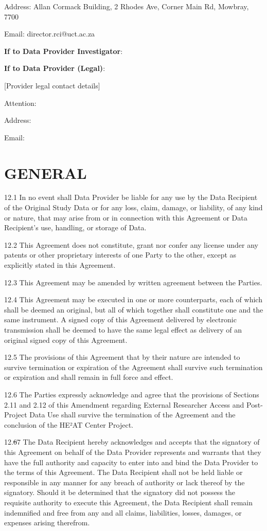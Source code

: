 \documentclass[12pt,letterpaper]{article}
\newcommand{\deleted}[1]{\textcolor{deletecolor}{\sout{#1}}}
\newcommand{\added}[1]{\textcolor{addcolor}{#1}}
\begin{document}
Address: Allan Cormack Building, 2 Rhodes Ave, Corner Main Rd, Mowbray, 7700

Email: director.rci@uct.ac.za

\textbf{If to Data Provider Investigator}:

\textbf{If to Data Provider (Legal)}:

[Provider legal contact details]

Attention:

Address:

Email:

\section{GENERAL}

12.1 In no event shall Data Provider be liable for any use by the Data Recipient of the Original Study Data or for any loss, claim, damage, or liability, of any kind or nature, that may arise from or in connection with this Agreement or Data Recipient's use, handling, or storage of Data.

12.2 This Agreement does not constitute, grant nor confer any license under any patents or other proprietary interests of one Party to the other, except as explicitly stated in this Agreement.

12.3 This Agreement may be amended by written agreement between the Parties.

12.4 This Agreement may be executed in one or more counterparts, each of which shall be deemed an original, but all of which together shall constitute one and the same instrument. A signed copy of this Agreement delivered by electronic transmission shall be deemed to have the same legal effect as delivery of an original signed copy of this Agreement.

12.5 The provisions of this Agreement that by their nature are intended to survive termination or expiration of the Agreement shall survive such termination or expiration and shall remain in full force and effect.

\added{12.6 The Parties expressly acknowledge and agree that the provisions of Sections 2.11 and 2.12 of this Amendment regarding External Researcher Access and Post-Project Data Use shall survive the termination of the Agreement and the conclusion of the HE²AT Center Project.}

12.\deleted{6}\added{7} The Data Recipient hereby acknowledges and accepts that the signatory of this Agreement on behalf of the Data Provider represents and warrants that they have the full authority and capacity to enter into and bind the Data Provider to the terms of this Agreement. The Data Recipient shall not be held liable or responsible in any manner for any breach of authority or lack thereof by the signatory. Should it be determined that the signatory did not possess the requisite authority to execute this Agreement, the Data Recipient shall remain indemnified and free from any and all claims, liabilities, losses, damages, or expenses arising therefrom.
\end{document}
